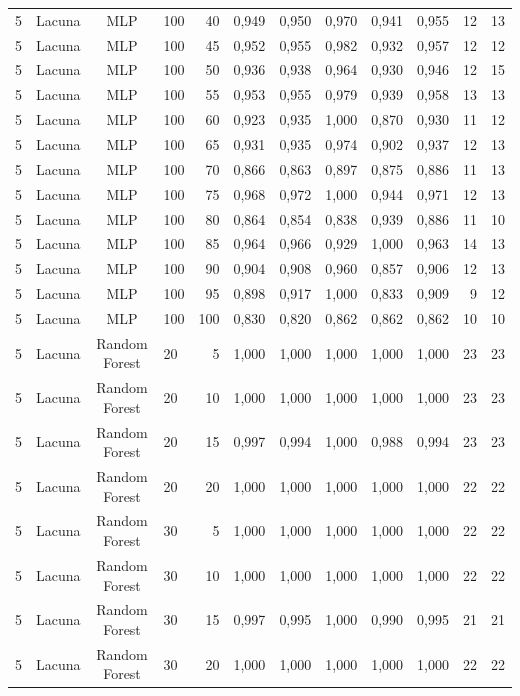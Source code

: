 \begin{longtable}{ccclrrrrrrrr}
5 & Lacuna & MLP & 100 & 40 & 0,949 & 0,950 & 0,970 & 0,941 & 0,955 & 12 & 13 \\
5 & Lacuna & MLP & 100 & 45 & 0,952 & 0,955 & 0,982 & 0,932 & 0,957 & 12 & 12 \\
5 & Lacuna & MLP & 100 & 50 & 0,936 & 0,938 & 0,964 & 0,930 & 0,946 & 12 & 15 \\
5 & Lacuna & MLP & 100 & 55 & 0,953 & 0,955 & 0,979 & 0,939 & 0,958 & 13 & 13 \\
5 & Lacuna & MLP & 100 & 60 & 0,923 & 0,935 & 1,000 & 0,870 & 0,930 & 11 & 12 \\
5 & Lacuna & MLP & 100 & 65 & 0,931 & 0,935 & 0,974 & 0,902 & 0,937 & 12 & 13 \\
5 & Lacuna & MLP & 100 & 70 & 0,866 & 0,863 & 0,897 & 0,875 & 0,886 & 11 & 13 \\
5 & Lacuna & MLP & 100 & 75 & 0,968 & 0,972 & 1,000 & 0,944 & 0,971 & 12 & 13 \\
5 & Lacuna & MLP & 100 & 80 & 0,864 & 0,854 & 0,838 & 0,939 & 0,886 & 11 & 10 \\
5 & Lacuna & MLP & 100 & 85 & 0,964 & 0,966 & 0,929 & 1,000 & 0,963 & 14 & 13 \\
5 & Lacuna & MLP & 100 & 90 & 0,904 & 0,908 & 0,960 & 0,857 & 0,906 & 12 & 13 \\
5 & Lacuna & MLP & 100 & 95 & 0,898 & 0,917 & 1,000 & 0,833 & 0,909 & 9 & 12 \\
5 & Lacuna & MLP & 100 & 100 & 0,830 & 0,820 & 0,862 & 0,862 & 0,862 & 10 & 10 \\
5 & Lacuna & Random Forest & 20 & 5 & 1,000 & 1,000 & 1,000 & 1,000 & 1,000 & 23 & 23 \\
5 & Lacuna & Random Forest & 20 & 10 & 1,000 & 1,000 & 1,000 & 1,000 & 1,000 & 23 & 23 \\
5 & Lacuna & Random Forest & 20 & 15 & 0,997 & 0,994 & 1,000 & 0,988 & 0,994 & 23 & 23 \\
5 & Lacuna & Random Forest & 20 & 20 & 1,000 & 1,000 & 1,000 & 1,000 & 1,000 & 22 & 22 \\
5 & Lacuna & Random Forest & 30 & 5 & 1,000 & 1,000 & 1,000 & 1,000 & 1,000 & 22 & 22 \\
5 & Lacuna & Random Forest & 30 & 10 & 1,000 & 1,000 & 1,000 & 1,000 & 1,000 & 22 & 22 \\
5 & Lacuna & Random Forest & 30 & 15 & 0,997 & 0,995 & 1,000 & 0,990 & 0,995 & 21 & 21 \\
5 & Lacuna & Random Forest & 30 & 20 & 1,000 & 1,000 & 1,000 & 1,000 & 1,000 & 22 & 22 \\

\end{longtable}

